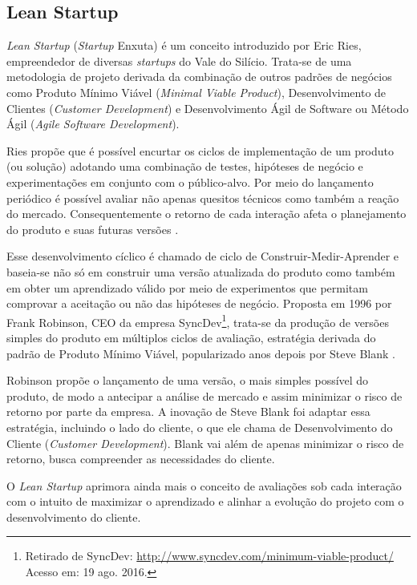 \subsection{Lean Startup}
\par \emph{Lean Startup} (\emph{Startup} Enxuta) é um conceito introduzido por Eric Ries, empreendedor de diversas \emph{startups} do Vale do Silício. Trata-se de uma metodologia de projeto derivada da combinação de outros padrões de negócios como Produto Mínimo Viável (\emph{Minimal Viable Product}), Desenvolvimento de Clientes (\emph{Customer Development}) e Desenvolvimento Ágil de Software ou Método Ágil (\emph{Agile Software Development}).
\par Ries propõe que é possível encurtar os ciclos de implementação de um produto (ou solução) adotando uma combinação de testes, hipóteses de negócio e experimentações em conjunto com o público-alvo. Por meio do lançamento periódico é possível avaliar não apenas quesitos técnicos como também a reação do mercado. Consequentemente o retorno de cada interação afeta o planejamento do produto e suas futuras versões \citep{ries:11}.
\par Esse desenvolvimento cíclico é chamado de ciclo de Construir-Medir-Aprender e baseia-se não só em construir uma versão atualizada do produto como também em obter um aprendizado válido por meio de experimentos que permitam comprovar a aceitação ou não das hipóteses de negócio. Proposta em 1996 por Frank Robinson, CEO da empresa SyncDev\footnote{ Retirado de SyncDev: \url{http://www.syncdev.com/minimum-viable-product/} Acesso em: 19 ago. 2016.}, trata-se da produção de versões simples do produto em múltiplos ciclos de avaliação, estratégia derivada do padrão de Produto Mínimo Viável, popularizado anos depois por Steve Blank \citep{junk:2000}.
\par Robinson propõe o lançamento de uma versão, o mais simples possível do produto, de modo a antecipar a análise de mercado e assim minimizar o risco de retorno por parte da empresa. A inovação de Steve Blank foi adaptar essa estratégia, incluindo o lado do cliente, o que ele chama de Desenvolvimento do Cliente (\emph{Customer Development}). Blank vai além de apenas minimizar o risco de retorno, busca compreender as necessidades do cliente.
\par O \emph{Lean Startup} aprimora ainda mais o conceito de avaliações sob cada interação com o intuito de maximizar o aprendizado e alinhar a evolução do projeto com o desenvolvimento do cliente.

